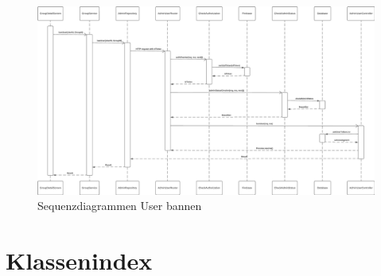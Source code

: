 \documentclass{entwurfsheft}
\begin{document}
\begin{sloppypar}
        \begin{figure}[htp]
            \centering
            \includegraphics[width = \linewidth]{images/processDescription/SequenzdiagrammBanUser.pdf}
            \caption{Sequenzdiagrammen User bannen}
        \end{figure}

    \newpage 

\newpage
\section{Klassenindex}

\end{sloppypar}
\end{document}
